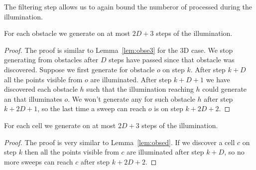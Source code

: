 \documentclass[english,gradu]{tktltiki2018}
\begin{document}
The filtering step allows us to again bound the numberor of \addEs processed during the illumination.

\begin{lem}\label{lem:obsed}For each obstacle we generate \obsE on at most $2D+3$ steps of the illumination.\end{lem}
\begin{proof}
The proof is similar to Lemma~\ref{lem:obse3} for the 3D case.
We stop generating \addEs from obstacles after $D$ steps have passed since that obstacle was discovered.
Suppose we first generate \obsE for obstacle $o$ on step $k$.
After step $k+D$ all the points visible from $o$ are illuminated.
After step $k+D+1$ we have discovered each obstacle $h$ such that the illumination reaching $h$ could generate an \addE that illuminates $o$.
We won't generate any \addEs for such obstacle $h$ after step $k+2D+1$, so the last time a sweep can reach $o$ is on step $k+2D+2$.
\end{proof}

\begin{lem}\label{lem:celled}For each cell we generate \cellE on at most $2D+3$ steps of the illumination.\end{lem}
\begin{proof}
The proof is very similar to Lemma~\ref{lem:obsed}.
If we discover a cell $c$ on step $k$ then all the points visible from $c$ are illuminated after step $k+D$, so no more sweeps can reach $c$ after step $k+2D+2$.
\end{proof}
\end{document}
